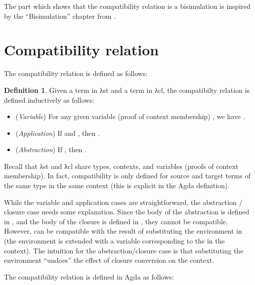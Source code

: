 \documentclass[bsc,frontabs,oneside,singlespacing,parskip,deptreport]{infthesis}
\theoremstyle{definition}
\newtheorem*{definition}{Definition}
\theoremstyle{lemma}
\begin{document}
The part which shows that the compatibility relation is a bisimulation
is inspired by the ``Bisimulation'' chapter from
\cite{DBLP:conf/sbmf/Wadler18}. 

\section{Compatibility relation}
\label{sec:comp-rel}

The compatibility relation is defined as follows:

\begin{definition}
  Given a term  in λst and a term  in λcl,
  the compatibilty relation  is defined inductively as
  follows:

  \begin{itemize}
  \item (\textit{Variable}) For any given variable (proof of context
    membership) , we have .

  \item (\textit{Application}) If  and ,
    then .

  \item (\textit{Abstraction}) If , then
    .
    
  \end{itemize}
\end{definition}

Recall that λst and λcl share types, contexts, and variables (proofs
of context membership). In fact, compatibility is only defined for source
and target terms of the same type in the same context (this is
explicit in the Agda definition).

While the variable and application cases are straightforward, the
abstraction / closure case needs some explanation. Since the body
 of the abstraction is defined in , and the body of
the closure  is defined in , they cannot be
compatible. However,  can be compatible with the result of
substituting the environment  in  (the environment is
extended with a variable corresponding to the  in the
context). The intuition for the abstraction/closure case is that
substituting the environment ``undoes'' the effect of closure conversion
on the context. 

The compatibility relation is defined in Agda as follows:

\end{document}
